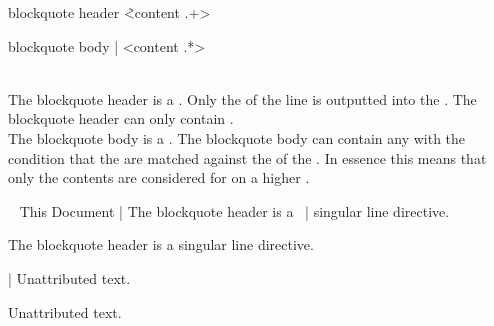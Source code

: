 \begin{identifier}{blockquote header}
\~ <content .+>
\end{identifier}
\begin{identifier}{blockquote body}
| <content .*>
\end{identifier}
 \\

The blockquote header is a . Only the  of the line is outputted into the . The blockquote header can only contain . \\

The blockquote body is a . The blockquote body can contain any  with the condition that the  are matched against the  of the . In essence this means that only the  contents are considered for  on a higher . \\

\begin{examples}
  \begin{examplesource}
~ This Document
| The blockquote header is a \
| singular line directive.
  \end{examplesource}
  \begin{exampleoutput}
    \begin{blockquote}
      The blockquote header is a singular line directive.
    \end{blockquote}
  \end{exampleoutput}
  \begin{examplesource}
| Unattributed text.
  \end{examplesource}
  \begin{exampleoutput}
    \begin{blockquote}
      Unattributed text.
    \end{blockquote}
  \end{exampleoutput}
\end{examples}

